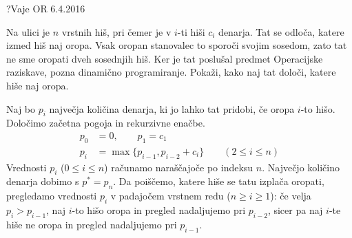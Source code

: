 \begin{naloga}{?}{Vaje OR 6.4.2016}
\begin{vprasanje}
Na ulici je $n$ vrstnih hiš,
pri čemer je v $i$-ti hiši $c_i$ denarja.
Tat se odloča, katere izmed hiš naj oropa.
Vsak oropan stanovalec to sporoči svojim sosedom,
zato tat ne sme oropati dveh sosednjih hiš.
Ker je tat poslušal predmet Operacijske raziskave,
pozna dinamično programiranje.
Pokaži, kako naj tat določi, katere hiše naj oropa.
\end{vprasanje}

\begin{odgovor}
Naj bo $p_i$ največja količina denarja,
ki jo lahko tat pridobi, če oropa $i$-to hišo.
Določimo začetna pogoja in rekurzivne enačbe.
\begin{align*}
p_0 &= 0, \qquad p_1 = c_1 \\
p_i &= \max\{p_{i-1}, p_{i-2} + c_i\} \qquad (2 \le i \le n)
\end{align*}
Vrednosti $p_i$ ($0 \le i \le n$) računamo naraščajoče po indeksu $n$.
Največjo količino denarja dobimo s $p^* = p_n$.
Da poiščemo, katere hiše se tatu izplača oropati,
pregledamo vrednosti $p_i$ v padajočem vrstnem redu ($n \ge i \ge 1$):
če velja $p_i > p_{i-1}$,
naj $i$-to hišo oropa in pregled nadaljujemo pri $p_{i-2}$,
sicer pa naj $i$-te hiše ne oropa in pregled nadaljujemo pri $p_{i-1}$.
\end{odgovor}
\end{naloga}
